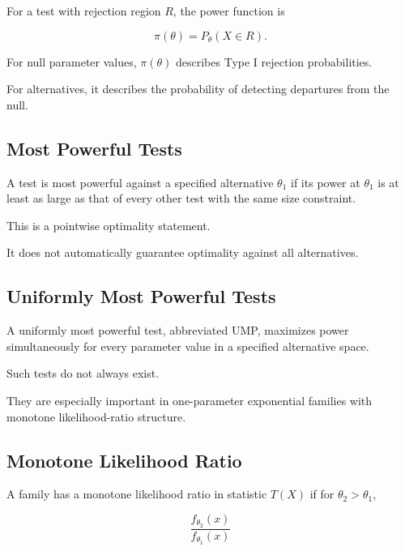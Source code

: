For a test with rejection region \(R\), the power function is

\[
\boxed{
\pi(\theta)
=
P_\theta(X\in R).
}
\]

For null parameter values, \(\pi(\theta)\) describes Type I rejection
probabilities.

For alternatives, it describes the probability of detecting departures
from the null.

\subsection{Most Powerful Tests}
\label{subsec:most-powerful-mathstat}

A test is most powerful against a specified alternative \(\theta_1\) if
its power at \(\theta_1\) is at least as large as that of every other
test with the same size constraint.

This is a pointwise optimality statement.

It does not automatically guarantee optimality against all alternatives.

\subsection{Uniformly Most Powerful Tests}
\label{subsec:ump-mathstat}

A uniformly most powerful test, abbreviated UMP, maximizes power
simultaneously for every parameter value in a specified alternative
space.

Such tests do not always exist.

They are especially important in one-parameter exponential families with
monotone likelihood-ratio structure.

\subsection{Monotone Likelihood Ratio}
\label{subsec:monotone-likelihood-ratio}

A family has a monotone likelihood ratio in statistic \(T(X)\) if for
\(\theta_2>\theta_1\),

\[
\boxed{
\frac{
f_{\theta_2}(x)
}{
f_{\theta_1}(x)
}
}
\]

